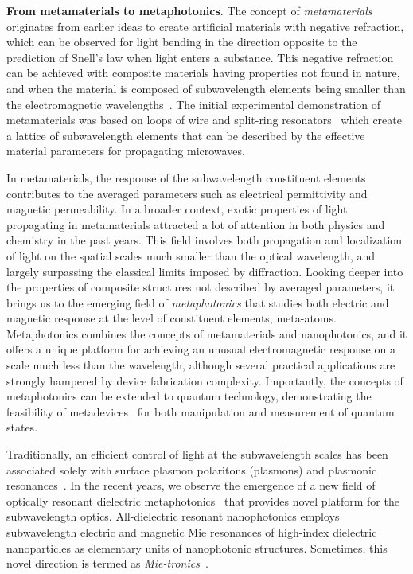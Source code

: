 \documentclass[journal=chreay,manuscript=review]{achemso}
\begin{document}
{\bf From metamaterials to metaphotonics}. The concept of {\it metamaterials} originates from earlier ideas to create artificial materials with negative refraction, which can be observed for light bending in the direction opposite to the prediction of Snell’s law when light enters a substance. This negative refraction can be achieved with composite materials having properties not found in nature, and when the material is composed of subwavelength elements being smaller than the electromagnetic wavelengths~\cite{xiang_2011}. The initial experimental demonstration of metamaterials was based on loops of wire and split-ring resonators~\cite{smith_2004} which create a lattice of subwavelength elements that can be described by the effective material parameters for propagating microwaves.

In metamaterials, the response of the subwavelength constituent elements contributes to the averaged parameters such as electrical permittivity and magnetic permeability. In a broader context, exotic properties of light propagating in metamaterials attracted a lot of attention in both physics and chemistry in the past years. This field involves both propagation and localization of light on the spatial scales much smaller than the optical wavelength, and largely surpassing the classical limits imposed by diffraction. Looking deeper into the properties of composite structures not described by averaged parameters, it brings us to the emerging field of {\it metaphotonics} that studies both electric and magnetic response at the level of constituent elements, meta-atoms. Metaphotonics combines the concepts of metamaterials and nanophotonics, and it offers a unique platform for achieving an unusual electromagnetic response on a scale much less than the wavelength, although several practical applications are strongly hampered by device fabrication complexity. Importantly, the concepts of metaphotonics can be extended to quantum technology, demonstrating the feasibility of metadevices~\cite{metadevices} for both manipulation and measurement of quantum states.

Traditionally, an efficient control of light at the subwavelength scales has been associated solely with surface plasmon polaritons (plasmons) and plasmonic resonances~\cite{plasmonics}. In the recent years, we observe the emergence of a new field of optically resonant dielectric metaphotonics~\cite{science_2021} that provides novel platform for the subwavelength optics. All-dielectric resonant nanophotonics employs subwavelength electric and magnetic Mie resonances of high-index dielectric nanoparticles as elementary units of nanophotonic structures. Sometimes, this novel direction is termed as {\it Mie-tronics}~\cite{Mie_won}. 
\end{document}
